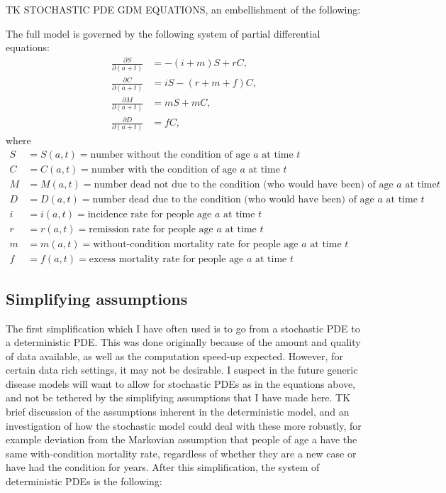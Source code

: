 TK STOCHASTIC PDE GDM EQUATIONS, an embellishment of the following:

The full model is governed by the following system of partial
differential equations:
\begin{align*}
\frac{\partial S}{\partial (a+t)} &= -(i + m)S + rC,\\
\frac{\partial C}{\partial (a+t)} &= iS - (r + m + f)C,\\
\frac{\partial M}{\partial (a+t)} &= mS + mC,\\
\frac{\partial D}{\partial (a+t)} &= fC,
\end{align*}
where
\begin{align*}
S &= S(a,t) = \text{number without the condition of age $a$ at time $t$}\\
C &= C(a,t) = \text{number with the condition of age $a$ at
  time $t$}\\
M &= M(a,t) = \text{number dead not due to the condition (who would have been) of age $a$ at time
$t$}\\
D &= D(a,t) = \text{number dead due to the condition
  (who would have been) of age $a$ at time $t$}\\[.1in]
i &= i(a,t) = \text{incidence rate for people age $a$ at time $t$}\\
r &= r(a,t) = \text{remission rate for people age $a$ at time $t$}\\
m &= m(a,t) = \text{without-condition mortality rate for people age $a$ at
time $t$}\\
f &= f(a,t) = \text{excess mortality rate for people age $a$ at time
  $t$}
\end{align*}

\subsection{Simplifying assumptions}
\label{theory-forward_sim-compartmental_model-simplying_assumptions}

The first simplification which I have often used is to go from a
stochastic PDE to a deterministic PDE. This was done originally
because of the amount and quality of data available, as well as the
computation speed-up expected.  However, for certain data rich
settings, it may not be desirable. I suspect in the future generic
disease models will want to allow for stochastic PDEs as in the
equations above, and not be tethered by the simplifying assumptions
that I have made here. TK brief discussion of the assumptions inherent
in the deterministic model, and an investigation of how the stochastic
model could deal with these more robustly, for example deviation from
the Markovian assumption that people of age a have the same
with-condition mortality rate, regardless of whether they are a new
case or have had the condition for years. After this simplification,
the system of deterministic PDEs is the following:

